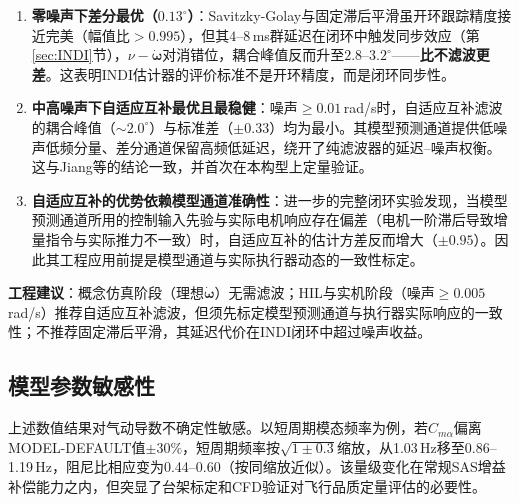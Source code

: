 \begin{enumerate}[label=(\arabic*)]
    \item \textbf{零噪声下差分最优（$0.13^\circ$）}：Savitzky-Golay与固定滞后平滑虽开环跟踪精度接近完美（幅值比$>0.995$），但其$4$--$8$\,ms群延迟在闭环中触发同步效应（第\ref{sec:INDI}节），$\nu-\dot{\boldsymbol{\omega}}$对消错位，耦合峰值反而升至$2.8$--$3.2^\circ$——\textbf{比不滤波更差}。这表明INDI估计器的评价标准不是开环精度，而是闭环同步性。
    \item \textbf{中高噪声下自适应互补最优且最稳健}：噪声$\ge 0.01$\,rad/s时，自适应互补滤波的耦合峰值（$\sim 2.0^\circ$）与标准差（$\pm 0.33$）均为最小。其模型预测通道提供低噪声低频分量、差分通道保留高频低延迟，绕开了纯滤波器的延迟--噪声权衡。这与Jiang等\cite{jiang2025adaptive}的结论一致，并首次在本构型上定量验证。
    \item \textbf{自适应互补的优势依赖模型通道准确性}：进一步的完整闭环实验发现，当模型预测通道所用的控制输入先验与实际电机响应存在偏差（电机一阶滞后导致增量指令与实际推力不一致）时，自适应互补的估计方差反而增大（$\pm 0.95$）。因此其工程应用前提是模型通道与实际执行器动态的一致性标定。
\end{enumerate}

\textbf{工程建议}：概念仿真阶段（理想$\dot{\boldsymbol{\omega}}$）无需滤波；HIL与实机阶段（噪声$\ge 0.005$\,rad/s）推荐自适应互补滤波，但须先标定模型预测通道与执行器实际响应的一致性；不推荐固定滞后平滑，其延迟代价在INDI闭环中超过噪声收益。

\subsection{模型参数敏感性}

上述数值结果对气动导数不确定性敏感。以短周期模态频率为例，若$C_{m\alpha}$偏离MODEL-DEFAULT值$\pm30\%$，短周期频率按$\sqrt{1\pm0.3}$缩放，从1.03\,Hz移至0.86--1.19\,Hz，阻尼比相应变为0.44--0.60（按同缩放近似）。该量级变化在常规SAS增益补偿能力之内，但突显了台架标定和CFD验证对飞行品质定量评估的必要性。

